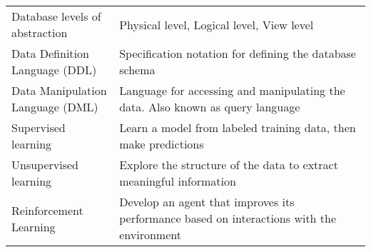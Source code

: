 \documentclass[a4paper,8pt,twocolumn]{extarticle}
\begin{document}
\begin{table}[h]
{\begin{tabular}{p{0.3\linewidth} | p{0.7\linewidth}}
Database levels of abstraction          & Physical level, Logical level,   View level                                                                                                                                                                                                      \\
Data Definition Language (DDL)          & Specification notation for defining the database schema                                                                                                                                                                                          \\
Data Manipulation Language (DML)        & Language for accessing and manipulating the data. Also known as query language                                                                                                                                                                   \\
Supervised learning                     & Learn a model from labeled training data,   then make predictions                                                                                                                                                                                \\
Unsupervised learning                   & Explore the structure of the data to extract meaningful information                                                                                                                                                                              \\
Reinforcement Learning                  & Develop an agent that improves its performance based on interactions with   the environment                                                                                                                                                     
\end{tabular}%
}
\end{table}

\begin{table}[h]
\end{table}
\end{document}
